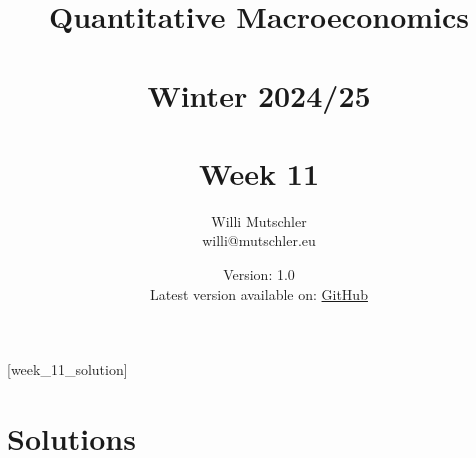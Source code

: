 
\newif\ifDisplaySolutions\DisplaySolutionstrue%


\title{Quantitative Macroeconomics\\~\\Winter 2024/25\\~\\Week 11}
\author{Willi Mutschler\\willi@mutschler.eu}
\date{Version: 1.0\\Latest version available on: \href{https://github.com/wmutschl/Quantitative-Macroeconomics/releases/latest/download/week_11.pdf}{GitHub}}
\maketitle\thispagestyle{empty}

\newpage
{}[week_11_solution]
\tableofcontents\thispagestyle{empty}\newpage

\setcounter{page}{1}
\newpage
\newpage
\newpage
\printbibliography%
\newpage

\ifDisplaySolutions%
\newpage
\appendix
\section{Solutions}

\fi
